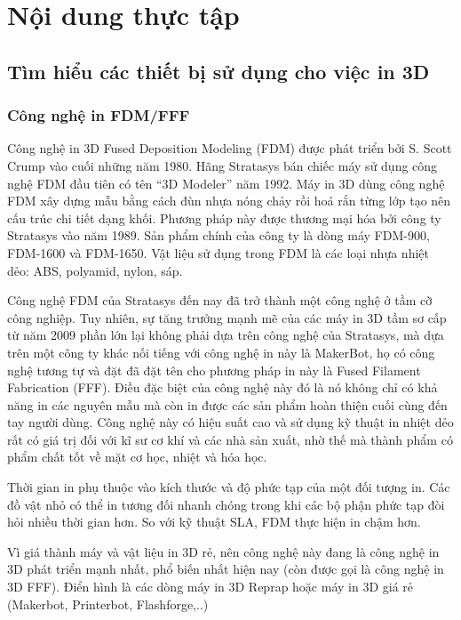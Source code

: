 \chapter{Nội dung thực tập}
\section{Tìm hiểu các thiết bị sử dụng cho việc in 3D}
\subsection{Công nghệ in FDM/FFF}
Công nghệ in 3D Fused Deposition Modeling (FDM) được phát triển bởi S. Scott Crump vào cuối những năm 1980.
Hãng Stratasys bán chiếc máy sử dụng công nghệ FDM đầu tiên có tên ``3D Modeler'' năm 1992.
Máy in 3D dùng công nghệ FDM xây dựng mẫu bằng cách đùn nhựa nóng chảy rồi hoá rắn từng lớp tạo nên cấu trúc chi tiết dạng khối.
Phương pháp này được thương mại hóa bởi công ty Stratasys vào năm 1989.
Sản phẩm chính của công ty là dòng máy FDM-900, FDM-1600 và FDM-1650. Vật liệu sử dụng trong FDM là các loại nhựa nhiệt dẻo: ABS, polyamid, nylon, sáp.

Công nghệ FDM của Stratasys đến nay đã trở thành một công nghệ ở tầm cỡ công nghiệp.
Tuy nhiên, sự tăng trưởng mạnh mẽ của các máy in 3D tầm sơ cấp từ năm 2009 phần lớn lại không phải dựa trên công nghệ của Stratasys, mà dựa trên một công ty khác nối tiếng với công nghệ in này là MakerBot, họ có công nghệ tương tự và đặt đã đặt tên cho phương pháp in này là Fused Filament Fabrication (FFF).
Điều đặc biệt của công nghệ này đó là nó không chỉ có khả năng in các nguyên mẫu mà còn in được các sản phẩm hoàn thiện cuối cùng đến tay người dùng.
Công nghệ này có hiệu suất cao và sử dụng kỹ thuật in nhiệt dẻo rất có giá trị đối với kĩ sư cơ khí và các nhà sản xuất, nhờ thế mà thành phẩm có phẩm chất tốt về mặt cơ học, nhiệt và hóa học.

Thời gian in phụ thuộc vào kích thước và độ phức tạp của một đối tượng in.
Các đồ vật nhỏ có thể in tương đối nhanh chóng trong khi các bộ phận phức tạp đòi hỏi nhiều thời gian hơn.
So với kỹ thuật SLA, FDM thực hiện in chậm hơn.

Vì giá thành máy và vật liệu in 3D rẻ, nên công nghệ này đang là công nghệ in 3D phát triển mạnh nhất, phổ biến nhất hiện nay (còn được gọi là công nghệ in 3D FFF).
Điển hình là các dòng máy in 3D Reprap hoặc máy in 3D giá rẻ (Makerbot, Printerbot, Flashforge,..)
